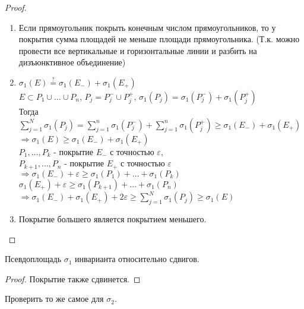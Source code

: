 \begin{proof}
    \begin{enumerate}
        \item Если прямоугольник покрыть конечным числом прямоугольников, то у покрытия сумма площадей не меньше площади прямоугольника.
        (Т.к. можно провести все вертикальные и горизонтальные линии и разбить на дизъюнктивное объединение)

        \item 
        $\sigma_1(E) \stackrel{?}{=} \sigma_1(E_-) + \sigma_1(E_+)$ \\
        \circled{$\geq$} $E \subset P_1 \cup \ldots \cup P_n$,  $P_j = P_j^- \cup P_j^+$,  $\sigma_1(P_j) = \sigma_1(P_j^-) + \sigma_1(P_j^+)$ \\
        Тогда $\sum\limits_{j=1}^N \sigma_1(P_j) = \sum\limits_{j=1}^n \sigma_1(P_j^-) + \sum\limits_{j=1}^n \sigma_1(P_j^+) \geq \sigma_1(E_-) + \sigma_1(E_+)$ \\
        $\Rightarrow \sigma_1(E) \geq \sigma_1(E_-) + \sigma_1(E_+)$ \\
        
        \circled{$\leq$} $P_1, \ldots, P_k$ - покрытие $E_-$ с точностью $\varepsilon$,  \\
        $P_{k + 1}, \ldots, P_n$ - покрытие $E_+$ с точностью $\varepsilon$ \\
        $\Rightarrow \sigma_1(E_-) + \varepsilon \geq \sigma_1(P_1) + \ldots + \sigma_1(P_k)$ \\
        $\sigma_1(E_+) + \varepsilon \geq \sigma_1(P_{k + 1}) + \ldots + \sigma_1(P_n)$ \\
        $\Rightarrow \sigma_1(E_-) + \sigma_1(E_+) + 2\varepsilon \geq \sum\limits_{j = 1}^N \sigma_1(P_j) \geq \sigma_1(E)$

        \item Покрытие большего является покрытием меньшего.
        
         
    \end{enumerate}
\end{proof}

\begin{theorem}
    Псевдоплощадь $\sigma_1$ инварианта относительно сдвигов.
\end{theorem}

\begin{proof}
    Покрытие также сдвинется.
\end{proof}

\begin{remark}
    Проверить то же самое для $\sigma_2$.
\end{remark}



